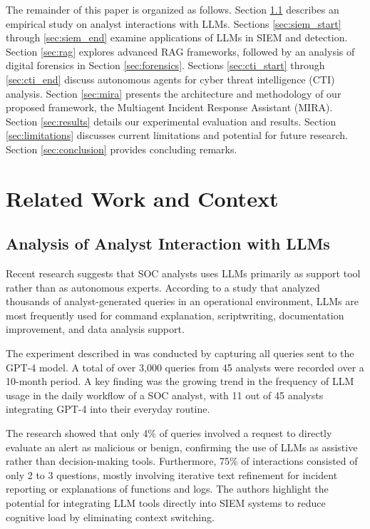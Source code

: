 \documentclass[conference]{IEEEtran}
\begin{document}
The remainder of this paper is organized as follows. 
Section \ref{sec:empirical} describes an empirical study on analyst interactions with LLMs. 
Sections \ref{sec:siem_start} through \ref{sec:siem_end} examine applications of LLMs in SIEM and detection. 
Section \ref{sec:rag} explores advanced RAG frameworks, followed by an analysis of digital forensics in Section \ref{sec:forensics}. 
Sections \ref{sec:cti_start} through \ref{sec:cti_end} discuss autonomous agents for cyber threat intelligence (CTI) analysis. 
Section \ref{sec:mira} presents the architecture and methodology of our proposed framework, the Multiagent Incident Response Assistant (MIRA). 
Section \ref{sec:results} details our experimental evaluation and results. Section \ref{sec:limitations} discusses current limitations and potential for future research. Section \ref{sec:conclusion} provides concluding remarks.

\section{Related Work and Context}\label{sec:related_work}
\subsection{Analysis of Analyst Interaction with LLMs}\label{sec:empirical}
Recent research suggests that SOC analysts uses LLMs primarily as support tool rather than as autonomous experts.
According to a study \cite{b1} that analyzed thousands of analyst-generated queries in an operational environment, 
LLMs are most frequently used for command explanation, scriptwriting, documentation improvement, and data analysis support.

The experiment described in \cite{b1} was conducted by capturing all queries sent to the GPT-4 model. 
A total of over 3,000 queries from 45 analysts were recorded over a 10-month period. 
A key finding was the growing trend in the frequency of LLM usage in the daily workflow of a SOC analyst, 
with 11 out of 45 analysts integrating GPT-4 into their everyday routine.

The research showed that only 4\% of queries involved a request to directly evaluate an alert as malicious or benign, 
confirming the use of LLMs as assistive rather than decision-making tools. 
Furthermore, 75\% of interactions consisted of only 2 to 3 questions, 
mostly involving iterative text refinement for incident reporting or explanations of functions and logs. 
The authors highlight the potential for integrating LLM tools directly into SIEM systems 
to reduce cognitive load by eliminating context switching.
\end{document}
